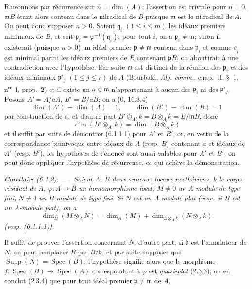 \documentclass[10pt,oneside]{book}
\newenvironment{corollary}[1][]{%
  \par\medskip\noindent\itshape Corollaire (#1). ---\ }{\par}
\begin{document}
Raisonnons par récurrence sur $n=\dim(A)$; l'assertion est triviale pour
$n=0$, $\mathfrak mB$ étant alors contenu dans le nilradical de $B$ puisque
$\mathfrak m$ est le nilradical de $A$. On peut donc supposer $n>0$. Soient
$\mathfrak q_i$ $(1\leq i\leq m)$ les idéaux premiers minimaux de $B$, et soit
$\mathfrak p_i=\varphi^{-1}(\mathfrak q_i)$; pour tout $i$, on a
$\mathfrak p_i\neq\mathfrak m$; sinon il existerait (puisque $n>0$) un idéal
premier $\mathfrak p\neq\mathfrak m$ contenu dans $\mathfrak p_i$ et comme
$\mathfrak q_i$ est minimal parmi les idéaux premiers de $B$ contenant
$\mathfrak pB$, on aboutirait à une contradiction avec l'hypothèse. Par suite
$\mathfrak m$ est distinct de la réunion des $\mathfrak p_i$ et des idéaux
minimaux $\mathfrak p'_j$ $(1\leq j\leq r)$ de $A$ (Bourbaki,
\emph{Alg. comm.}, chap.~II, §~1, n\textsuperscript{o}~1, prop.~2) et il
existe un $a\in\mathfrak m$ n'appartenant à aucun des $\mathfrak p_i$ ni des
$\mathfrak p'_j$. Posons $A'=A/aA$, $B'=B/aB$; on a (0, 16.3.4)
\[
\dim(A')=\dim(A)-1,\qquad \dim(B')=\dim(B)-1
\]
par construction de $a$, et d'autre part
$B'\otimes_{A'}k=B\otimes_Ak=B/\mathfrak mB$, donc
\[
\dim(B'\otimes_{A'}k)=\dim(B\otimes_Ak)
\]
et il suffit par suite de démontrer (6.1.1.1) pour $A'$ et $B'$; or, en vertu
de la correspondance biunivoque entre idéaux de $A$ (resp. $B$) contenant $a$
et idéaux de $A'$ (resp. $B'$), les hypothèses de l'énoncé sont aussi
valables pour $A'$ et $B'$; on peut donc appliquer l'hypothèse de récurrence,
ce qui achève la démonstration.

\begin{corollary}[6.1.2]
\label{IV.2.s6.1.2-fr}
Soient $A$, $B$ deux anneaux locaux noethériens, $k$ le corps résiduel de
$A$, $\varphi:A\to B$ un homomorphisme local, $M\neq0$ un $A$-module de type
fini, $N\neq0$ un $B$-module de type fini. Si $N$ est un $A$-module plat
(resp. si $B$ est un $A$-module plat), on a
\begin{equation}
\dim_B(M\otimes_A N)=\dim_A(M)+
\dim_{B\otimes_Ak}(N\otimes_Ak)
\tag{6.1.2.1}\label{IV.2.s6.1.2.1-fr}
\end{equation}
(resp. (6.1.1.1)).
\end{corollary}

Il suffit de prouver l'assertion concernant $N$; d'autre part, si
$\mathfrak b$ est l'annulateur de $N$, on peut remplacer $B$ par
$B/\mathfrak b$, et par suite supposer que
$\operatorname{Supp}(N)=\operatorname{Spec}(B)$; l'hypothèse signifie alors
que le morphisme $f:\operatorname{Spec}(B)\to\operatorname{Spec}(A)$
correspondant à $\varphi$ est \emph{quasi-plat} (2.3.3); on en conclut
(2.3.4) que pour tout idéal premier $\mathfrak p\neq\mathfrak m$ de $A$,
\end{document}

